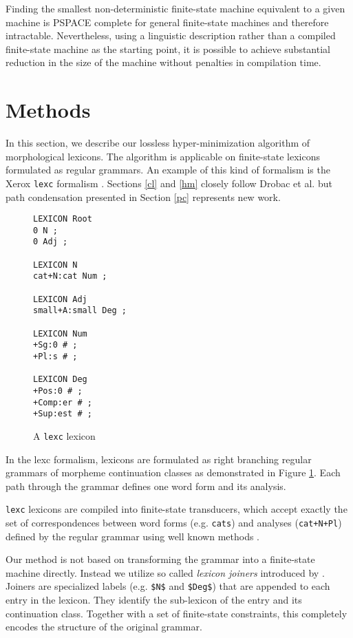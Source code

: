 \documentclass[11pt]{article}
\begin{document}
Finding the smallest non-deterministic finite-state machine equivalent
to a given machine is PSPACE complete \cite{jiang1993} for general
finite-state machines and therefore intractable. Nevertheless, using a
linguistic description rather than a compiled finite-state machine
as the starting point, it is possible to achieve substantial reduction in
the size of the machine without penalties in compilation time.

\section{Methods}\label{sec:methods}

In this section, we describe our lossless hyper-minimization algorithm
of morphological lexicons. The algorithm is applicable on finite-state
lexicons formulated as regular grammars. An example of this kind of
formalism is the Xerox {\tt lexc} formalism
\cite{beesley2003finite}. Sections \ref{cl} and \ref{hm} closely
follow Drobac et al.  but path condensation
presented in Section \ref{pc} represents new work.

\begin{figure}
\begin{small}
\begin{verbatim}
LEXICON Root
0 N ;
0 Adj ;

LEXICON N
cat+N:cat Num ;

LEXICON Adj
small+A:small Deg ;

LEXICON Num
+Sg:0 # ;
+Pl:s # ;

LEXICON Deg
+Pos:0 # ;
+Comp:er # ;
+Sup:est # ; 
\end{verbatim}
\end{small}
\caption{A {\tt lexc} lexicon}\label{fig:lexc}
\end{figure}

In the lexc formalism, lexicons are formulated as right branching
regular grammars of morpheme continuation classes as demonstrated in
Figure \ref{fig:lexc}. Each path through the grammar defines one word form
and its analysis. 

{\tt lexc} lexicons are compiled into finite-state transducers, which
accept exactly the set of correspondences between word forms
(e.g. {\tt cats}) and analyses ({\tt cat+N+Pl}) defined by the regular
grammar using well known methods \cite{hopcroft2006}.

Our method is not based on transforming the grammar into a finite-state
machine directly. Instead we utilize so called {\it lexicon joiners}
introduced by \cite{linden2009}. Joiners are specialized labels
(e.g. {\tt \$N\$} and {\tt \$Deg\$}) that are appended to each
entry in the lexicon. They identify the sub-lexicon of the entry and
its continuation class. Together with a set of finite-state
constraints, this completely encodes the structure of the original
grammar.
\end{document}
